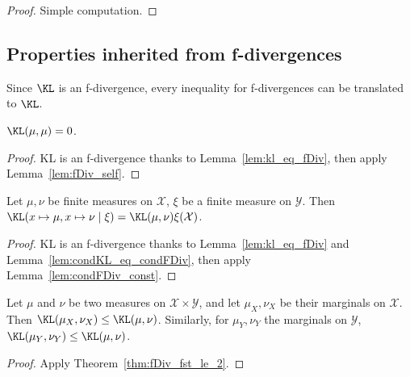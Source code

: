 \begin{proof}\leanok
Simple computation.
\end{proof}



\subsection{Properties inherited from f-divergences}

Since $\KL$ is an f-divergence, every inequality for f-divergences can be translated to $\KL$.

\begin{lemma}
  \label{lem:kl_self}
  \mathlibok
  $\KL(\mu, \mu) = 0$.
\end{lemma}

\begin{proof}\mathlibok
  KL is an f-divergence thanks to Lemma~\ref{lem:kl_eq_fDiv}, then apply Lemma~\ref{lem:fDiv_self}.
\end{proof}

\begin{lemma}
  \label{lem:condKL_const}
  \leanok
  Let $\mu, \nu$ be finite measures on $\mathcal X$, $\xi$ be a finite measure on $\mathcal Y$. 
  Then $\KL(x \mapsto \mu, x \mapsto \nu \mid \xi) = \KL(\mu, \nu) \xi (\mathcal X)$.
\end{lemma}

\begin{proof} \leanok
  KL is an f-divergence thanks to Lemma~\ref{lem:kl_eq_fDiv} and Lemma~\ref{lem:condKL_eq_condFDiv}, then apply Lemma~\ref{lem:condFDiv_const}.
\end{proof}


\begin{theorem}[Marginals]
  \label{thm:kl_fst_le}
  \leanok
  Let $\mu$ and $\nu$ be two measures on $\mathcal X \times \mathcal Y$, and let $\mu_X, \nu_X$ be their marginals on $\mathcal X$.
  Then $\KL(\mu_X, \nu_X) \le \KL(\mu, \nu)$.
  Similarly, for $\mu_Y, \nu_Y$ the marginals on $\mathcal Y$, $\KL(\mu_Y, \nu_Y) \le \KL(\mu, \nu)$.
\end{theorem}

\begin{proof} \leanok
{}
Apply Theorem~\ref{thm:fDiv_fst_le_2}.
\end{proof}


